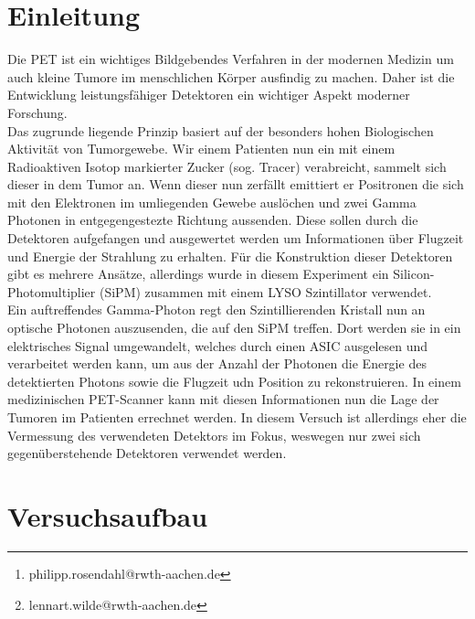 \documentclass[12pt,twoside,a4paper]{scrartcl}
\author{Philipp Rosendahl Mat.-Nr: 378092\thanks{philipp.rosendahl@rwth-aachen.de}
		\and Lennart Wilde, Mat.-Nr: 381588\thanks{lennart.wilde@rwth-aachen.de}}
\begin{document}
\maketitle
\newpage

\tableofcontents
\newpage


\section{Einleitung}

	Die PET ist ein wichtiges Bildgebendes Verfahren in der modernen Medizin um auch kleine Tumore im menschlichen Körper ausfindig zu machen. Daher ist die Entwicklung leistungsfähiger Detektoren ein wichtiger Aspekt moderner Forschung. \\

	Das zugrunde liegende Prinzip basiert auf der besonders hohen Biologischen Aktivität von Tumorgewebe. Wir einem Patienten nun ein mit einem Radioaktiven Isotop markierter Zucker (sog. Tracer) verabreicht, sammelt sich dieser in dem Tumor an. Wenn dieser nun zerfällt emittiert er Positronen die sich mit den Elektronen im umliegenden Gewebe auslöchen und zwei Gamma Photonen in entgegengestezte Richtung aussenden. Diese sollen durch die Detektoren aufgefangen und ausgewertet werden um Informationen über Flugzeit und Energie der Strahlung zu erhalten. Für die Konstruktion dieser Detektoren gibt es mehrere Ansätze, allerdings wurde in diesem Experiment ein Silicon-Photomultiplier (SiPM) zusammen mit einem LYSO Szintillator verwendet.\\

	Ein auftreffendes Gamma-Photon regt den Szintillierenden Kristall nun an optische Photonen auszusenden, die auf den SiPM treffen. Dort werden sie in ein elektrisches Signal umgewandelt, welches durch einen ASIC ausgelesen und verarbeitet werden kann, um aus der Anzahl der Photonen die Energie des detektierten Photons sowie die Flugzeit udn Position zu rekonstruieren. In einem medizinischen PET-Scanner kann mit diesen Informationen nun die Lage der Tumoren im Patienten errechnet werden. In diesem Versuch ist allerdings eher die Vermessung des verwendeten Detektors im Fokus, weswegen nur zwei sich gegenüberstehende Detektoren verwendet werden.

	\newpage

\section{Versuchsaufbau}
\end{document}
